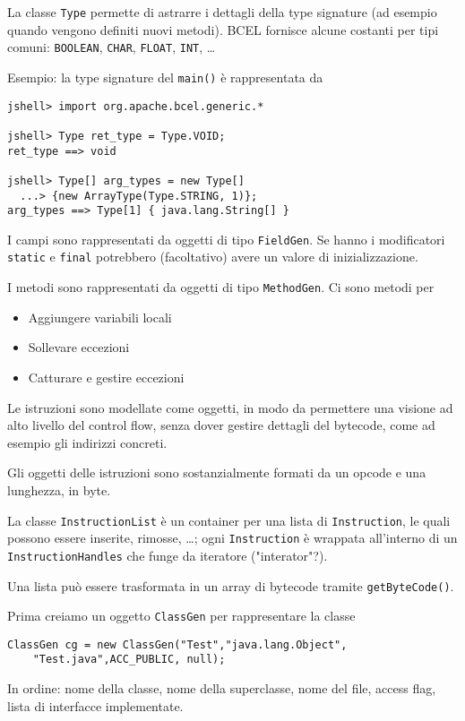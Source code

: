 La classe \texttt{Type} permette di astrarre i dettagli della type signature (ad esempio quando vengono definiti nuovi metodi). BCEL fornisce alcune costanti per tipi comuni: \texttt{BOOLEAN}, \texttt{CHAR}, \texttt{FLOAT}, \texttt{INT}, \dots

Esempio: la type signature del \texttt{main()} è rappresentata da
\begin{verbatim}
jshell> import org.apache.bcel.generic.*

jshell> Type ret_type = Type.VOID;
ret_type ==> void

jshell> Type[] arg_types = new Type[]
  ...> {new ArrayType(Type.STRING, 1)};
arg_types ==> Type[1] { java.lang.String[] }
\end{verbatim}

I campi sono rappresentati da oggetti di tipo \texttt{FieldGen}. Se hanno i modificatori \texttt{static} e \texttt{final} potrebbero (facoltativo) avere un valore di inizializzazione.

I metodi sono rappresentati da oggetti di tipo \texttt{MethodGen}. Ci sono metodi per
\begin{itemize}
    \item  Aggiungere variabili locali

    \item Sollevare eccezioni

    \item Catturare e gestire eccezioni
\end{itemize}

Le istruzioni sono modellate come oggetti, in modo da permettere una visione ad alto livello del control flow, senza dover gestire dettagli del bytecode, come ad esempio gli indirizzi concreti.

Gli oggetti delle istruzioni sono sostanzialmente formati da un opcode e una lunghezza, in byte.

La classe \texttt{InstructionList} è un container per una lista di \texttt{Instruction}, le quali possono essere inserite, rimosse, \dots; ogni \texttt{Instruction} è wrappata all'interno di un \texttt{InstructionHandles} che funge da iteratore ("interator"?).

Una lista può essere trasformata in un array di bytecode tramite \texttt{getByteCode()}.

Prima creiamo un oggetto \texttt{ClassGen} per rappresentare la classe
\begin{verbatim}
ClassGen cg = new ClassGen("Test","java.lang.Object",
    "Test.java",ACC_PUBLIC, null);
\end{verbatim}
In ordine: nome della classe, nome della superclasse, nome del file, access flag, lista di interfacce implementate.

